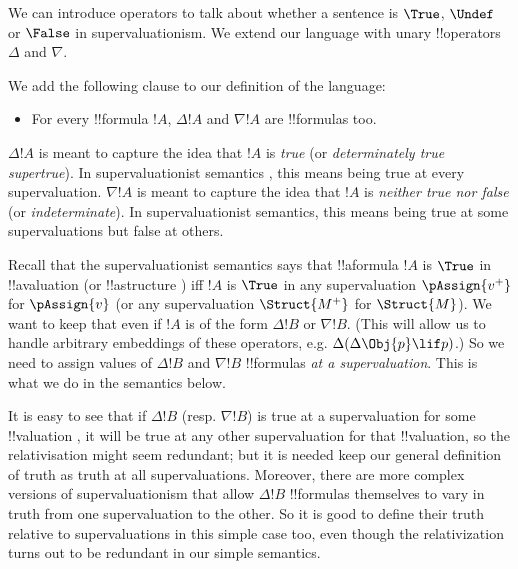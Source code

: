 \documentclass[../../../include/open-logic-section]{subfiles}
\begin{document}


We can introduce operators to talk about whether a sentence is $\True$, 
$\Undef$ or $\False$ in supervaluationism. We extend our language 
with unary !!{operator}s $\Delta$ and $\nabla$.

\begin{defn}
We add the following clause to our definition of the language:
\begin{itemize}
\item  For every !!{formula} $!A$, $\Delta !A$ and $\nabla !A$ are 
	!!{formula}s too.
\end{itemize}
\end{defn}

\begin{explain}
$\Delta !A$ is meant to capture the idea that $!A$ is \emph{true} (or 
\emph{determinately true} \emph{supertrue}). In supervaluationist 
semantics ,  this means being true at every supervaluation. $\nabla
!A$ is meant to capture the idea that $!A$ is \emph{neither true nor
false} (or  \emph{indeterminate}). In supervaluationist semantics, 
this means being true at some supervaluations but false at others.

Recall that the supervaluationist semantics says that !!a{formula}
$!A$ is $\True$ in !!a{valuation}  (or !!a{structure} 
) iff $!A$ is $\True$ in any supervaluation $\pAssign{v^+}$
for $\pAssign{v}$ (or any supervaluation $\Struct{M^+}$ for 
$\Struct{M}$). We want to keep that even if $!A$ is of the form 
$\Delta !B$ or $\nabla !B$. (This will allow us to handle arbitrary 
embeddings of these operators, e.g. $\Delta (\Delta \Obj{p} \lif p)$.)
So we need to assign values of $\Delta !B$ and $\nabla !B$ !!{formula}s
\emph{at a supervaluation}. This is what we do in the semantics below.

It is easy to see that if 
$\Delta !B$ (resp. $\nabla !B$) is true at a supervaluation for some
!!{valuation} , it will be true at any other supervaluation
for that !!{valuation}, so the relativisation might seem redundant; but
it is needed keep our general definition of truth as truth at all
supervaluations. Moreover, there are more complex versions of 
supervaluationism that allow $\Delta !B$ !!{formula}s themselves
to vary in truth from one supervaluation to the other. So it is 
good to define their truth relative to supervaluations in this simple
case too, even though the relativization turns out to be redundant in
our simple semantics.
\end{explain}
\end{document}
